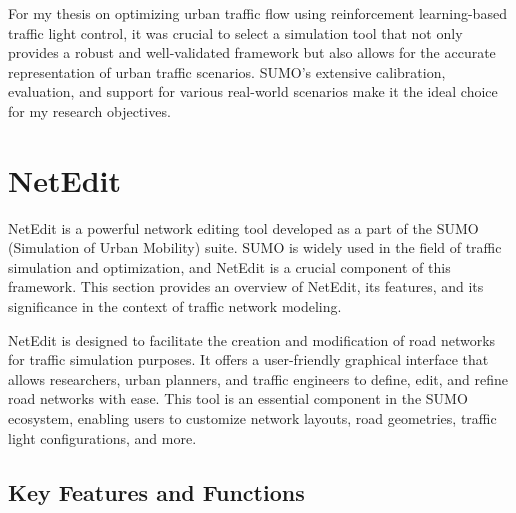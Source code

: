 For my thesis on optimizing urban traffic flow using reinforcement learning-based traffic light control, it was crucial to select a simulation tool that not only provides a robust and well-validated framework but also allows for the accurate representation of urban traffic scenarios. SUMO's extensive calibration, evaluation, and support for various real-world scenarios make it the ideal choice for my research objectives.

\section{NetEdit} \label{sec:netedit}
NetEdit is a powerful network editing tool developed as a part of the SUMO (Simulation of Urban Mobility)\cite{SUMO2018} suite. SUMO is widely used in the field of traffic simulation and optimization, and NetEdit is a crucial component of this framework. This section provides an overview of NetEdit, its features, and its significance in the context of traffic network modeling.

NetEdit is designed to facilitate the creation and modification of road networks for traffic simulation purposes. It offers a user-friendly graphical interface that allows researchers, urban planners, and traffic engineers to define, edit, and refine road networks with ease. This tool is an essential component in the SUMO ecosystem, enabling users to customize network layouts, road geometries, traffic light configurations, and more.

\subsection{Key Features and Functions}

